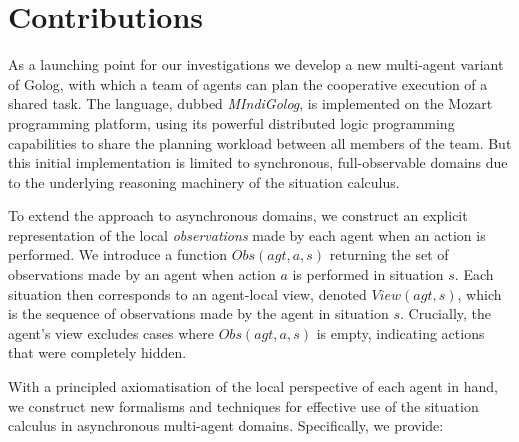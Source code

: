 \section{Contributions}

As a launching point for our investigations we develop a new multi-agent
variant of Golog, with which a team of agents can plan the cooperative
execution of a shared task. The language, dubbed \emph{MIndiGolog},
is implemented on the Mozart programming platform, using its powerful
distributed logic programming capabilities to share the planning workload
between all members of the team. But this initial implementation is
limited to synchronous, full-observable domains due to the underlying
reasoning machinery of the situation calculus.

To extend the approach to asynchronous domains, we construct an explicit
representation of the local \emph{observations} made by each agent
when an action is performed. We introduce a function $Obs(agt,a,s)$
returning the set of observations made by an agent when action $a$
is performed in situation $s$. Each situation then corresponds to
an agent-local view, denoted $View(agt,s)$, which is the sequence
of observations made by the agent in situation $s$. Crucially, the
agent's view excludes cases where $Obs(agt,a,s)$ is empty, indicating
actions that were completely hidden.

With a principled axiomatisation of the local perspective of each
agent in hand, we construct new formalisms and techniques for effective
use of the situation calculus in asynchronous multi-agent domains.
Specifically, we provide:

